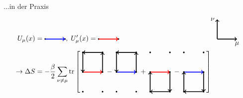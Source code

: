 \documentclass[ngerman]{beamer}
\begin{document}
\begin{frame}{...in der Praxis}
	\begin{align*}
	U_\mu(x) &= \begin{tikzpicture}[baseline=-0.5ex]
	\foreach \x in {0,1}
	{
		\foreach \y in {0}
		{
			\fill[color=black] (\x,\y) circle (.04);
		}
	}
	\draw[->, blue, very thick] (0,0) -> (1,0);
	\end{tikzpicture}, \;
	U'_\mu(x) = \begin{tikzpicture}[baseline=-0.5ex]
	\foreach \x in {0,1}
	{
		\foreach \y in {0}
		{
			\fill[color=black] (\x,\y) circle (.04);
		}
	}
	\draw[->, red, very thick] (0,0) -> (1,0);
	\draw[->, very thick] (6,0) -> (7,0) node [below] {$\mu$};
	\draw[->, very thick] (6,0) -> (6,1) node [left] {$\nu$};
	\end{tikzpicture}\\
	\rightarrow \Delta S 
	&= -\frac{\beta}{2} \sum_{\nu \neq \mu} \text{tr} \left[ \; \begin{tikzpicture}[baseline=-0.5ex]
	\draw[->, very thick, red] (0,0) -> (1,0);
	\draw[->, very thick] (1,0) -> (1,1);
	\draw[->, very thick] (1,1) -> (0,1);
	\draw[->, very thick] (0,1) -> (0,0);
	\foreach \x in {0,...,1}
	{
		\foreach \y in {-1,...,1}
		{
			\fill[color=black] (\x,\y) circle (.04);
		}
	}
	\end{tikzpicture}
	\; - \;
	\begin{tikzpicture}[baseline=-0.5ex]
	\draw[->, very thick, blue] (0,0) -> (1,0);
	\draw[->, very thick] (1,0) -> (1,1);
	\draw[->, very thick] (1,1) -> (0,1);
	\draw[->, very thick] (0,1) -> (0,0);
	\foreach \x in {0,...,1}
	{
		\foreach \y in {-1,...,1}
		{
			\fill[color=black] (\x,\y) circle (.04);
		}
	}
	\end{tikzpicture}
	\; + \;
	\begin{tikzpicture}[baseline=-0.5ex]
	\draw[->, very thick, red] (0,0) -> (1,0);
	\draw[->, very thick] (1,0) -> (1,-1);
	\draw[->, very thick] (1,-1) -> (0,-1);
	\draw[->, very thick] (0,-1) -> (0,0);
	\foreach \x in {0,...,1}
	{
		\foreach \y in {-1,...,1}
		{
			\fill[color=black] (\x,\y) circle (.04);
		}
	}
	\end{tikzpicture}
	\; - \;
	\begin{tikzpicture}[baseline=-0.5ex]
	\draw[->, very thick, blue] (0,0) -> (1,0);
	\draw[->, very thick] (1,0) -> (1,-1);
	\draw[->, very thick] (1,-1) -> (0,-1);
	\draw[->, very thick] (0,-1) -> (0,0);
	\foreach \x in {0,...,1}
	{
		\foreach \y in {-1,...,1}
		{
			\fill[color=black] (\x,\y) circle (.04);
		}
	}
	\end{tikzpicture} \; \right] \\[.5cm]

\end{align*}
\end{frame}
\end{document}
